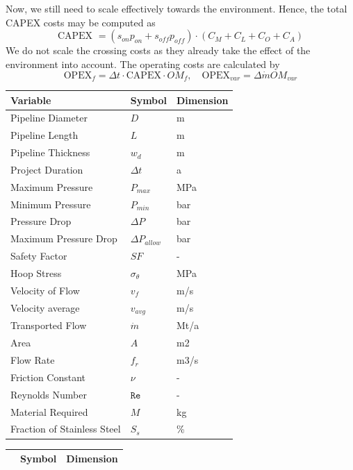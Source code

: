 \documentclass{article}
\begin{document}
Now, we still need to scale effectively towards the environment. Hence, the total CAPEX costs may be computed as
\begin{equation}
\text{CAPEX } =(s_{on}p_{on} + s_{off}p_{off})\cdot (C_M + C_L + C_O +C_A)
\end{equation}
 We do not scale the crossing costs as they already take the effect of the environment into account. The operating costs are calculated by
\begin{equation}
\text{OPEX}_f = \Delta t\cdot\text{CAPEX}\cdot OM_f, \quad \text{OPEX}_{var} = \Delta \dot{m} OM_{var}
\end{equation}

\begin{table}[h!]
\parbox{0.45\linewidth}{
\centering
\begin{tabular}[t]{@{}lll@{}}
\toprule
Variable              &  	Symbol  & Dimension \\ \midrule
Pipeline Diameter & $D$ &  m \\
Pipeline Length &$L$& m\\
Pipeline Thickness & $w_d$ & m \\
Project Duration &$\Delta t$& a\\
Maximum Pressure & $P_{max}$ & MPa \\
Minimum Pressure & $P_{min}$ &bar \\
Pressure Drop & $ \Delta P$& bar \\
Maximum Pressure Drop & $ \Delta P_{allow}$ &bar \\
Safety Factor & $ SF$ & - \\
Hoop Stress & $\sigma_{\theta}$ & MPa \\
Velocity of Flow & $v_f$ & m/s \\
Velocity average &$v_{avg}$& m/s\\
Transported Flow &$\dot{m} $& Mt/a\\
Area &$ A $& m2\\
Flow Rate & $f_r$ & m3/s \\
Friction Constant &$  \nu $ & - \\
Reynolds Number & $\mathtt{Re} $ & - \\
Material Required & $M$ & kg \\
Fraction of Stainless Steel &$ S_s $ &\%\\
\end{tabular}
}
\hfill
\parbox{0.45\linewidth}{
\centering
\begin{tabular}[t]{@{}lll@{}}
\toprule
              &  	Symbol  & Dimension \\ \midrule

\end{tabular}}
\end{table}
\end{document}
